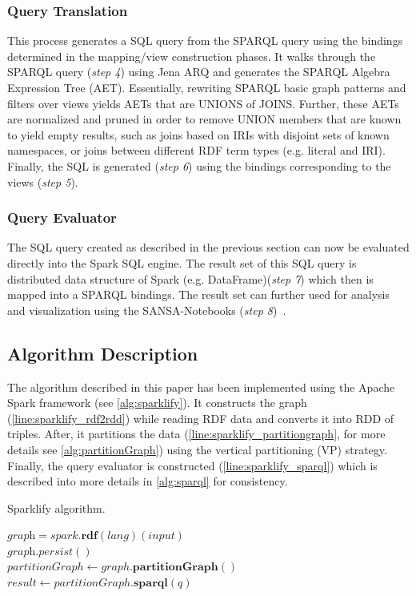 \subsubsection{Query Translation}
This process generates a SQL query from the SPARQL query using the bindings determined in the mapping/view construction phases.
It walks through the SPARQL query (\textit{step 4}) using Jena ARQ and generates the SPARQL Algebra Expression Tree (AET). Essentially, rewriting SPARQL basic graph patterns and filters over views yields AETs that are UNIONS of JOINS.
Further, these AETs are normalized and pruned in order to remove UNION members that are known to yield empty results, such as joins based on IRIs with disjoint sets of known namespaces, or joins between different RDF term types (e.g. literal and IRI).
Finally, the SQL is generated (\textit{step 6}) using the bindings corresponding to the views (\textit{step 5}).

\subsubsection{Query Evaluator}
The SQL query created as described in the previous section can now be evaluated directly into the Spark SQL engine.
The result set of this SQL query is distributed data structure of Spark (e.g. DataFrame)(\textit{step 7}) which then is mapped into a SPARQL bindings.
The result set can further used for analysis and visualization using the SANSA-Notebooks (\textit{step 8})~\cite{iermilov-2017-sansa-iswc-demo}.

\subsection{Algorithm Description}
\label{subsection:algorithm}
The algorithm described in this paper has been implemented using the Apache Spark framework (see \autoref{alg:sparklify}).
It constructs the graph (\autoref{line:sparklify_rdf2rdd}) while reading RDF data and converts it into RDD of triples.
After, it partitions the data (\autoref{line:sparklify_partitiongraph}, for more details see \autoref{alg:partitionGraph}) using the vertical partitioning (VP) strategy.
Finally, the query evaluator is constructed (\autoref{line:sparklify_sparql}) which is described into more details in \autoref{alg:sparql} for consistency.

\begin{algorithm}[t]
\caption{Sparklify algorithm.}
\label{alg:sparklify}
    $\textit{graph} = spark.\textbf{rdf}(lang)(input)$ \label{line:sparklify_rdf2rdd}\\
    $\textit{graph}.persist()$\\
    $partitionGraph \leftarrow graph.\textbf{partitionGraph}()$ \label{line:sparklify_partitiongraph}\\
    $result \leftarrow partitionGraph.\textbf{sparql}(q)$ \label{line:sparklify_sparql}\\
\end{algorithm}

